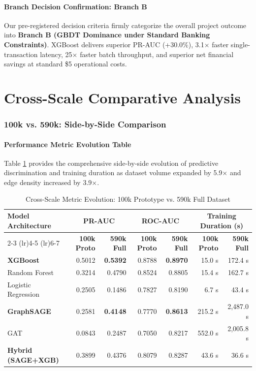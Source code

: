 \documentclass[11pt,a4paper]{report}
\begin{document}
\subsection{Branch Decision Confirmation: Branch B}
Our pre-registered decision criteria firmly categorize the overall project outcome into \textbf{Branch B (GBDT Dominance under Standard Banking Constraints)}. XGBoost delivers superior PR-AUC (+30.0\%), 3.1$\times$ faster single-transaction latency, 25$\times$ faster batch throughput, and superior net financial savings at standard \$5 operational costs.

\part{Cross-Scale Comparative Analysis}

\section{100k vs. 590k: Side-by-Side Comparison}

\subsection{Performance Metric Evolution Table}
Table \ref{tab:cross_scale_metrics} provides the comprehensive side-by-side evolution of predictive discrimination and training duration as dataset volume expanded by 5.9$\times$ and edge density increased by 3.9$\times$.

\begin{table}[H]
\centering
\caption{Cross-Scale Metric Evolution: 100k Prototype vs. 590k Full Dataset}
\label{tab:cross_scale_metrics}
\small
\begin{tabular}{lrrrrrr}
\toprule
\textbf{Model Architecture} & \multicolumn{2}{c}{\textbf{PR-AUC}} & \multicolumn{2}{c}{\textbf{ROC-AUC}} & \multicolumn{2}{c}{\textbf{Training Duration (s)}} \\
\cmidrule(lr){2-3} \cmidrule(lr){4-5} \cmidrule(lr){6-7}
 & \textbf{100k Proto} & \textbf{590k Full} & \textbf{100k Proto} & \textbf{590k Full} & \textbf{100k Proto} & \textbf{590k Full} \\
\midrule
\textbf{XGBoost} & 0.5012 & \textbf{0.5392} & 0.8788 & \textbf{0.8970} & 15.0 s & 172.4 s \\
Random Forest & 0.3214 & 0.4790 & 0.8524 & 0.8805 & 15.4 s & 162.7 s \\
Logistic Regression & 0.2505 & 0.1486 & 0.7827 & 0.8190 & 6.7 s & 43.4 s \\
\textbf{GraphSAGE} & 0.2581 & \textbf{0.4148} & 0.7770 & \textbf{0.8613} & 215.2 s & 2,487.0 s \\
GAT & 0.0843 & 0.2487 & 0.7050 & 0.8217 & 552.0 s & 2,005.8 s \\
\textbf{Hybrid (SAGE+XGB)} & 0.3899 & 0.4376 & 0.8079 & 0.8287 & 43.6 s & 36.6 s \\
\bottomrule
\end{tabular}
\end{table}
\end{document}
